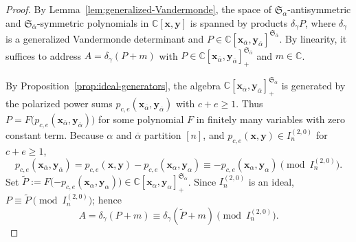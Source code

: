 \documentclass[11pt, noadjust, reqno]{amsart}
\theoremstyle{definition}
\theoremstyle{remark}
\numberwithin{equation}{section}
\newcommand{\0}{\emptyset}
\newcommand{\C}{\mathbb{C}}
\begin{document}
\begin{proof}
    By Lemma~\ref{lem:generalized-Vandermonde}, the space of $\mathfrak{S}_{\alpha}$-antisymmetric and $\mathfrak{S}_{\overline{\alpha}}$-symmetric polynomials in $\C[\bm{x},\bm{y}]$ is spanned by products $\delta_\gamma P$,
    where $\delta_\gamma$ 
    is a generalized Vandermonde determinant 
    and $P \in \C[\bm{x}_{\overline{\alpha}},\bm{y}_{\overline{\alpha}}]^{\mathfrak{S}_{\overline{\alpha}}}$.
    By linearity, it suffices to address $A = \delta_\gamma (P+ m)$ with $P \in \C[\bm{x}_{\overline{\alpha}},\bm{y}_{\overline{\alpha}}]^{\mathfrak{S}_{\overline{\alpha}}}_+$ and $m \in \C$. 

    By Proposition~\ref{prop:ideal-generators}, the algebra $\C[\bm{x}_{\overline{\alpha}}, \bm{y}_{\overline{\alpha}}]_+^{\mathfrak{S}_{\overline{\alpha}}}$ is generated by the polarized power sums $p_{c,e}(\bm{x}_{\overline{\alpha}}, \bm{y}_{\overline{\alpha}})$ with $c + e \geq 1$.
    Thus $P = F\big(p_{c,e}(\bm{x}_{\overline{\alpha}}, \bm{y}_{\overline{\alpha}})\big)$ for some polynomial $F$ in finitely many variables with zero constant term.
    Because $\alpha$ and $\overline{\alpha}$ partition $[n]$, and $p_{c,e}(\bm{x},\bm{y}) \in I_n^{(2,0)}$ for $c+e \geq 1$, 
    \[p_{c,e}(\bm{x}_{\overline{\alpha}},\bm{y}_{\overline{\alpha}}) = p_{c,e}(\bm{x},\bm{y}) - p_{c,e}(\bm{x}_{\alpha},\bm{y}_{\alpha})
\equiv - p_{c,e}(\bm{x}_{\alpha},\bm{y}_{\alpha}) \pmod {I_n^{(2,0)}}.\]
Set $\widetilde{P} := F\big({-p_{c,e}(\bm{x}_{\alpha}, \bm{y}_{\alpha})}\big) \in \C[\bm{x}_{\alpha}, \bm{y}_{\alpha}]^{\mathfrak{S}_{\alpha}}_+$.
Since $I_n^{(2,0)}$ is an ideal, $P \equiv \widetilde{P} \pmod{I_n^{(2,0)}}$; hence
\[ A = \delta_\gamma (P+m) \equiv \delta_\gamma (\widetilde{P} +m) \pmod {I_n^{(2,0)}}.\]


\end{proof}
\end{document}
